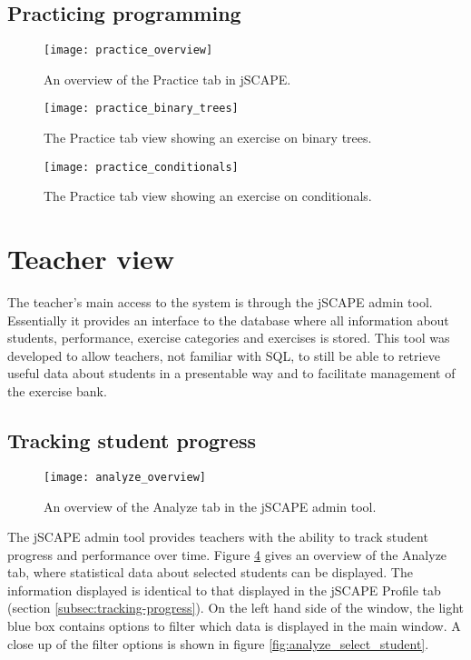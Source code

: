 \subsection{Practicing programming}
\begin{figure}[H]
\centering
\texttt{[image: practice\_overview]}
\caption{An overview of the Practice tab in jSCAPE.}
\label{fig:practice_overview}
\end{figure}

\begin{figure}[H]
\centering
\texttt{[image: practice\_binary\_trees]}
\caption{The Practice tab view showing an exercise on binary trees.}
\label{fig:practice_binary_trees}
\end{figure}

\begin{figure}[H]
\centering
\texttt{[image: practice\_conditionals]}
\caption{The Practice tab view showing an exercise on conditionals.}
\label{fig:practice_conditionals}
\end{figure}


\section{Teacher view}
The teacher's main access to the system is through the jSCAPE admin tool. Essentially it provides an interface to the database where all information about students, performance, exercise categories and exercises is stored. This tool was developed to allow teachers, not familiar with SQL, to still be able to retrieve useful data about students in a presentable way and to facilitate management of the exercise bank.

\subsection{Tracking student progress}
\begin{figure}[H]
\centering
\texttt{[image: analyze\_overview]}
\caption{An overview of the Analyze tab in the jSCAPE admin tool.}
\label{fig:analyze_overview}
\end{figure}

The jSCAPE admin tool provides teachers with the ability to track student progress and performance over time. Figure \ref{fig:analyze_overview} gives an overview of the Analyze tab, where statistical data about selected students can be displayed. The information displayed is identical to that displayed in the jSCAPE Profile tab (section \ref{subsec:tracking-progress}). On the left hand side of the window, the light blue box contains options to filter which data is displayed in the main window. A close up of the filter options is shown in figure \ref{fig:analyze_select_student}.

